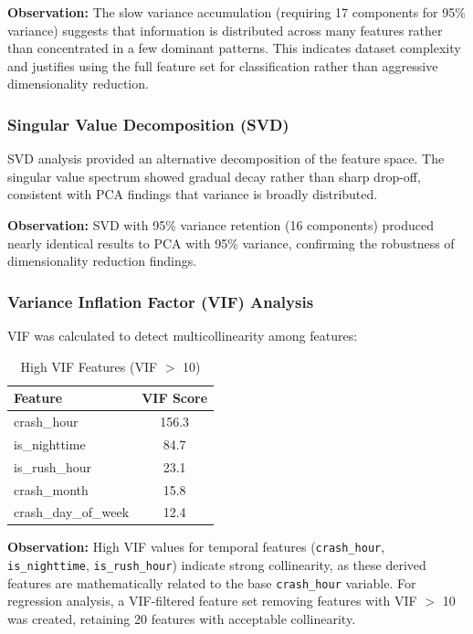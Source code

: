 \documentclass[12pt,man]{apa7}
\begin{document}
\textbf{Observation:} The slow variance accumulation (requiring 17 components for 95\% variance) suggests that information is distributed across many features rather than concentrated in a few dominant patterns. This indicates dataset complexity and justifies using the full feature set for classification rather than aggressive dimensionality reduction.

\subsubsection{Singular Value Decomposition (SVD)}

SVD analysis provided an alternative decomposition of the feature space. The singular value spectrum showed gradual decay rather than sharp drop-off, consistent with PCA findings that variance is broadly distributed.

\textbf{Observation:} SVD with 95\% variance retention (16 components) produced nearly identical results to PCA with 95\% variance, confirming the robustness of dimensionality reduction findings.

\subsubsection{Variance Inflation Factor (VIF) Analysis}

VIF was calculated to detect multicollinearity among features:

\begin{table}[H]
\centering
\caption{High VIF Features (VIF $>$ 10)}
\begin{tabular}{lc}
\toprule
\textbf{Feature} & \textbf{VIF Score} \\
\midrule
crash\_hour & 156.3 \\
is\_nighttime & 84.7 \\
is\_rush\_hour & 23.1 \\
crash\_month & 15.8 \\
crash\_day\_of\_week & 12.4 \\
\bottomrule
\end{tabular}
\end{table}

\textbf{Observation:} High VIF values for temporal features (\texttt{crash\_hour}, \texttt{is\_nighttime}, \texttt{is\_rush\_hour}) indicate strong collinearity, as these derived features are mathematically related to the base \texttt{crash\_hour} variable. For regression analysis, a VIF-filtered feature set removing features with VIF $>$ 10 was created, retaining 20 features with acceptable collinearity.
\end{document}
